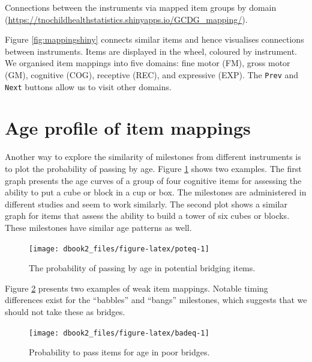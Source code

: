 \documentclass[
]{book}
\begin{document}
\label{fig:mappingshiny}Connections between the instruments via mapped item groups by domain (\url{https://tnochildhealthstatistics.shinyapps.io/GCDG_mapping/}).



Figure \ref{fig:mappingshiny} connects similar items and hence visualises connections between instruments. Items are displayed in the wheel, coloured by instrument. We organised item mappings into five domains: fine motor (FM), gross motor (GM), cognitive (COG), receptive (REC), and expressive (EXP). The \texttt{Prev} and \texttt{Next} buttons allow us to visit other domains.

\hypertarget{sec:viewmapping}{%
\section{Age profile of item mappings}\label{sec:viewmapping}}

Another way to explore the similarity of milestones from different instruments is to plot the probability of passing by age. Figure \ref{fig:poteq} shows two examples. The first graph presents the age curves of a group of four cognitive items for assessing the ability to put a cube or block in a cup or box. The milestones are administered in different studies and seem to work similarly. The second plot shows a similar graph for items that assess the ability to build a tower of six cubes or blocks. These milestones have similar age patterns as well.

\begin{figure}

{\centering \texttt{[image: dbook2\_files/figure-latex/poteq-1]} 

}

\caption{The probability of passing by age in potential bridging items.}\label{fig:poteq}
\end{figure}



Figure \ref{fig:badeq} presents two examples of weak item mappings. Notable timing differences exist for the ``babbles'' and ``bangs'' milestones, which suggests that we should not take these as bridges.

\begin{figure}

{\centering \texttt{[image: dbook2\_files/figure-latex/badeq-1]} 

}

\caption{Probability to pass items for age in poor bridges.}\label{fig:badeq}
\end{figure}
\end{document}
